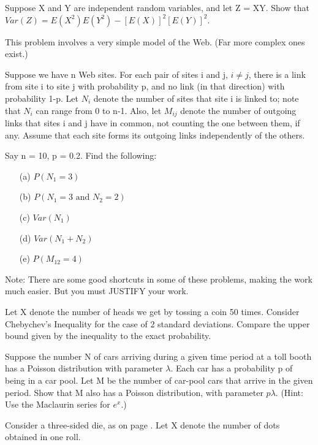 \oneproblem
Suppose X and Y are independent random variables, and let Z = XY. Show
that $Var(Z) = E(X^2)   E(Y^2) - [E(X)]^2   [E(Y)]^2$. 

\oneproblem
This problem involves a very simple model of the Web. (Far more complex
ones exist.)

Suppose we have n Web sites. For each pair of sites i and j, $i \neq j$,
there is a link from site i to site j with probability p, and no link
(in that direction) with probability 1-p. Let $N_i$ denote the number of
sites that site i is linked to; note that $N_i$ can range from 0 to n-1.
Also, let $M_{ij}$ denote the number of outgoing links that sites i and
j have in common, not counting the one between them, if any. Assume that
each site forms its outgoing links independently of the others.

Say n = 10, p = 0.2. Find the following:

\begin{itemize}

\item [(a)] $P(N_1 = 3)$

\item [(b)] $P(N_1 = 3 \textrm{ and } N_2 = 2)$

\item [(c)] $Var(N_1)$

\item [(d)] $Var(N_1 + N_2)$

\item [(e)] $P(M_{12} = 4)$

\end{itemize}

Note: There are some good shortcuts in some of these problems, making
the work much easier. But you must JUSTIFY your work.

\oneproblem
Let X denote the number of heads we get by tossing a coin 50 times.
Consider Chebychev's Inequality for the case of 2 standard deviations.
Compare the upper bound given by the inequality to the exact probability.

\oneproblem
Suppose the number N of cars arriving during a given time period at a
toll booth has a Poisson distribution with parameter $\lambda$. Each 
car has a probability p of being in a car pool. Let M be the number of
car-pool cars that arrive in the given period. Show that M also has a Poisson   
distribution, with parameter $p \lambda$. (Hint: Use the Maclaurin series for   
$e^x$.) 

\oneproblem
Consider a three-sided die, as on page \pageref{threesideddiepage}.  Let
X denote the number of dots obtained in one roll.

